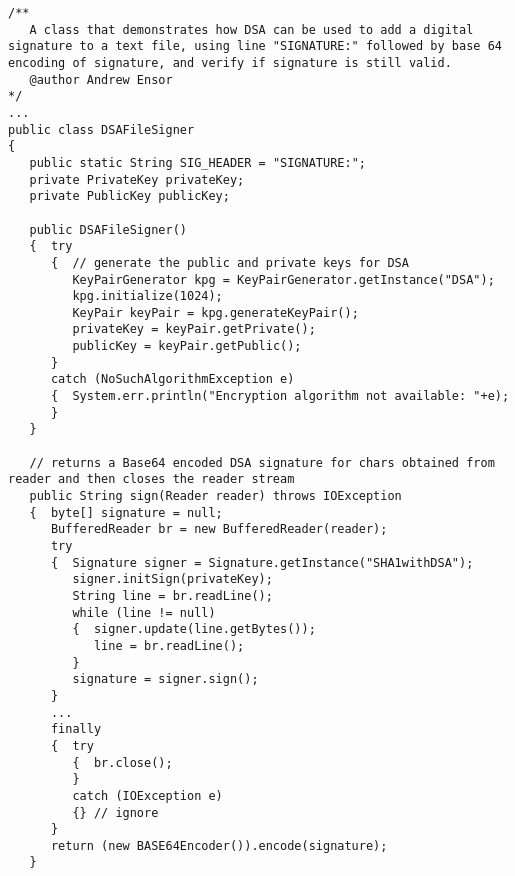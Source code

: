 \begin{lstlisting}[caption=Digital Signature Algorithm]
/**
   A class that demonstrates how DSA can be used to add a digital signature to a text file, using line "SIGNATURE:" followed by base 64 encoding of signature, and verify if signature is still valid.
   @author Andrew Ensor
*/
...
public class DSAFileSigner
{
   public static String SIG_HEADER = "SIGNATURE:";
   private PrivateKey privateKey;
   private PublicKey publicKey;

   public DSAFileSigner()
   {  try
      {  // generate the public and private keys for DSA
         KeyPairGenerator kpg = KeyPairGenerator.getInstance("DSA");
         kpg.initialize(1024);
         KeyPair keyPair = kpg.generateKeyPair();
         privateKey = keyPair.getPrivate();
         publicKey = keyPair.getPublic();
      }
      catch (NoSuchAlgorithmException e)
      {  System.err.println("Encryption algorithm not available: "+e);
      }
   }

   // returns a Base64 encoded DSA signature for chars obtained from reader and then closes the reader stream
   public String sign(Reader reader) throws IOException
   {  byte[] signature = null;
      BufferedReader br = new BufferedReader(reader);
      try
      {  Signature signer = Signature.getInstance("SHA1withDSA");
         signer.initSign(privateKey);
         String line = br.readLine();
         while (line != null)
         {  signer.update(line.getBytes());
            line = br.readLine();
         }
         signature = signer.sign();
      }
      ...
      finally
      {  try
         {  br.close();
         }
         catch (IOException e)
         {} // ignore
      }
      return (new BASE64Encoder()).encode(signature);
   }


\end{lstlisting}
